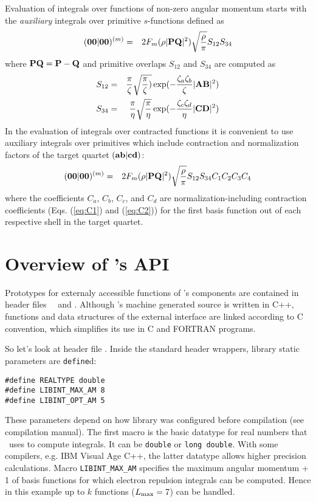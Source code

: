 \documentclass[12pt]{article}
\begin{document}
Evaluation of integrals over functions of non-zero angular momentum starts with the
{\em auxiliary} integrals over primitive $s$-functions
defined as
\begin{eqnarray}
({\bf 00}|{\bf 00})^{(m)} & = & 2 F_m(\rho |{\bf PQ}|^2) \sqrt{\frac{\rho}{\pi}}S_{12}S_{34}
\end{eqnarray}
where ${\bf PQ} = {\bf P} - {\bf Q}$ and primitive overlaps $S_{12}$ and $S_{34}$
are computed as
\begin{eqnarray}
S_{12} & = & \frac{\pi}{\zeta} \sqrt{\frac{\pi}{\zeta})}
\exp (-\frac{\zeta_a\zeta_b}{\zeta} |{\bf AB}|^2) \\
S_{34} & = & \frac{\pi}{\eta} \sqrt{\frac{\pi}{\eta}}
\exp (-\frac{\zeta_c\zeta_d}{\eta} |{\bf CD}|^2)
\end{eqnarray}
In the evaluation of integrals over contracted functions it is convenient to
use auxiliary integrals over primitives which include contraction and normalization factors of the
target quartet $({\bf ab}|{\bf cd})$:
\begin{eqnarray} \label{eq:0000m}
({\bf 00}|{\bf 00})^{(m)} & = &  2 F_m(\rho |{\bf PQ}|^2) \sqrt{\frac{\rho}{\pi}}S_{12}S_{34}
C_1 C_2 C_3 C_4
\end{eqnarray}
where the coefficients $C_a$, $C_b$, $C_c$, and $C_d$ are
normalization-including contraction coefficients (Eqs. (\ref{eq:C1})
and (\ref{eq:C2})) for the first basis function out of each respective shell
in the target quartet.

\section{Overview of \LIBINT 's API}

Prototypes for externaly accessible functions of \LIBINT's components are contained
in header files \libinth\, \libderivh\, and \librijh . Although \LIBINT's
machine generated source is written in C++, functions and data structures of
the external interface are linked according to C convention, which simplifies
its use in C and FORTRAN programs.

So let's look at header file \libinth. Inside the standard header wrappers,
library static parameters are {\tt define}d:
\begin{verbatim}
#define REALTYPE double
#define LIBINT_MAX_AM 8
#define LIBINT_OPT_AM 5
\end{verbatim}
These parameters depend on how library was configured before compilation (see compilation manual).
The first macro is the basic datatype for real numbers that \LIBINT\ uses
to compute integrals. It can be {\tt double} or {\tt long double}. With some compilers, e.g.
IBM Visual Age C++, the latter datatype allows higher precision calculations.
Macro {\tt LIBINT\_MAX\_AM} specifies the
maximum angular momentum + 1 of basis functions for which
electron repulsion integrals can be computed. Hence in this example up to $k$ functions ($L_{\rm max}=7$)
can be handled.
\end{document}
